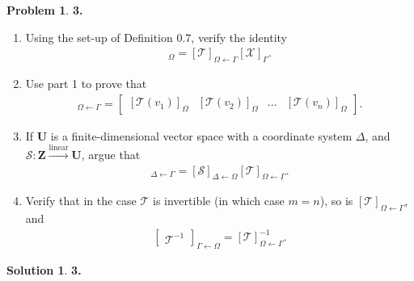 \documentclass{article}
\theoremstyle{definition}
\newtheorem*{prob*}{Problem}
\newtheorem*{sln*}{Solution}
\newcommand{\Z}{\mathbf{Z}}
\newcommand{\U}{\mathbf{U}}
\begin{document}
\newpage



\begin{prob*}\textbf{3.}
	\begin{enumerate}
		\item Using the set-up of Definition 0.7, verify the identity
		\begin{align*}
		[\mathcal{T(X)}]_\Omega = [\mathcal{T}]_{\Omega \leftarrow \Gamma}[\mathcal{X}]_\Gamma.
		\end{align*}
		
		
		
		\item Use part 1 to prove that 
		\begin{align*}
		[\mathcal{T}]_{\Omega\leftarrow\Gamma} = \begin{bmatrix}
		[\mathcal{T}(v_1)]_\Omega & [\mathcal{T}(v_2)]_\Omega & \dots & [\mathcal{T}(v_n)]_\Omega  
		\end{bmatrix}.
		\end{align*}
		
		
		
		\item If $\U$ is a finite-dimensional vector space with a coordinate system $\Delta$, and $\mathcal{S} : \Z \overset{\text{linear}}{\longrightarrow} \U$, argue that 
		\begin{align*}
		[\mathcal{S}\circ \mathcal{T}]_{\Delta \leftarrow \Gamma} = [\mathcal{S}]_{\Delta \leftarrow \Omega}[\mathcal{T}]_{\Omega\leftarrow\Gamma}.
		\end{align*}
		
		
		\item Verify that in the case $\mathcal{T}$ is invertible (in which case $m=n$), so is $[\mathcal{T}]_{\Omega\leftarrow \Gamma}$, and 
		\begin{align*}
		\begin{bmatrix}
		\mathcal{T}^{-1}
		\end{bmatrix}_{\Gamma\leftarrow\Omega} = [\mathcal{T}]^{-1}_{\Omega\leftarrow \Gamma}.
		\end{align*}
	\end{enumerate}

	
	
	
	\begin{sln*}\textbf{3.}
		\begin{enumerate}
			

\end{enumerate}
\end{sln*}
\end{prob*}
\end{document}

